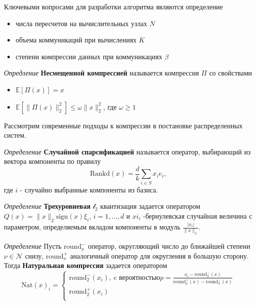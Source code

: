Ключевыми вопросами для разработки алгоритма являются определение \begin{itemize}
    \item числа пересчетов на вычислительных узлах $N$
    \item объема коммуникаций при вычислениях $K$
    \item степени компрессии данных при коммуникациях $\beta$ 
\end{itemize}
    
\textit{Опредление} \textbf{Несмещенной компрессией} называется компрессия $\Pi$ со свойствами \begin{itemize}
    \item $\mathbb{E}[\Pi(x)] = x$
    \item $\mathbb{E}[\|\Pi(x)\|^2_2] \le \omega \| x \|^2_2$, где $\omega \ge 1$
\end{itemize}

Рассмотрим современные подходы к компрессии в постановке распределенных систем. 

\textit{Определение} \textbf{Случайной спарсификацией} \cite{richtarik2016parallel}называется оператор, 
выбирающий из вектора компоненты по правилу
\begin{equation}
    \text{Rankd}(x) = \frac{d}{k} \sum_{i \in S} x_i e_i,
\end{equation}
где $i$ - случайно выбранные компоненты из базиса.

\textit{Определение} \textbf{Трехуровневая} $\mathcal{l}_2$ квантизация задается оператором
$Q(x)=\|x\|_2 \text{sign}(x)\xi_i$, $i=1,\dots,d$  и $xi_i$ -бернулевская случайная величина с параметром,
определяемым вкладом компоненты в модуль $\frac{|x_i|}{\|x\|_2}$.

\textit{Определение} Пусть $\text{round}_\nu^-$ оператор, округляющий число до ближайшей степени $\nu \in \mathcal{N}$ снизу, 
$\text{round}_\nu^+$ аналогичный оператор для округления в большую сторону. Тогда \textbf{Натуральная компрессия} 
задается оператором
\begin{equation}
    \text{Nat}(x)_i = \left\{\begin{array}{c}
        \text{round}_2^-(x_i), \ \text{c вероятностью} p=\frac{x_i - \text{round}_2^-(x)}{\text{round}_2^+(x)-\text{round}_2^-(x)} \\
        \text{round}_2^+(x_i) \\
    \end{array}\right.    
\end{equation}

